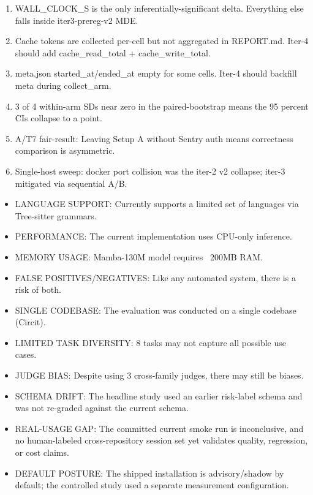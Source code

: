 

\begin{enumerate}
    \item WALL_CLOCK_S is the only inferentially-significant delta. Everything else falls inside iter3-prereg-v2 MDE.
    \item Cache tokens are collected per-cell but not aggregated in REPORT.md. Iter-4 should add cache_read_total + cache_write_total.
    \item meta.json started_at/ended_at empty for some cells. Iter-4 should backfill meta during collect_arm.
    \item 3 of 4 within-arm SDs near zero in the paired-bootstrap means the 95 percent CIs collapse to a point.
    \item A/T7 fair-result: Leaving Setup A without Sentry auth means correctness comparison is asymmetric.
    \item Single-host sweep: docker port collision was the iter-2 v2 collapse; iter-3 mitigated via sequential A/B.
\end{enumerate}


\begin{itemize}
    \item LANGUAGE SUPPORT: Currently supports a limited set of languages via Tree-sitter grammars.
    \item PERFORMANCE: The current implementation uses CPU-only inference.
    \item MEMORY USAGE: Mamba-130M model requires ~200MB RAM.
    \item FALSE POSITIVES/NEGATIVES: Like any automated system, there is a risk of both.
\end{itemize}


\begin{itemize}
    \item SINGLE CODEBASE: The evaluation was conducted on a single codebase (Circit).
    \item LIMITED TASK DIVERSITY: 8 tasks may not capture all possible use cases.
    \item JUDGE BIAS: Despite using 3 cross-family judges, there may still be biases.
    \item SCHEMA DRIFT: The headline study used an earlier risk-label schema and
    was not re-graded against the current schema.
    \item REAL-USAGE GAP: The committed current smoke run is inconclusive, and
    no human-labeled cross-repository session set yet validates quality,
    regression, or cost claims.
    \item DEFAULT POSTURE: The shipped installation is advisory/shadow by
    default; the controlled study used a separate measurement configuration.
\end{itemize}

